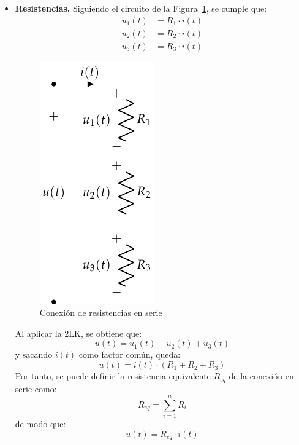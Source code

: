 \documentclass[11pt]{book} %
\numberwithin{dummy}{section}
\theoremstyle{ocrenumbox}
\theoremstyle{blacknumex}
\theoremstyle{blacknumbox}
\theoremstyle{ocrenum}
\begin{document}
	\begin{itemize}
		\item \textbf{Resistencias.} Siguiendo el circuito de la Figura~\ref{fig.serie}, se cumple que:
		\begin{align*}
			u_1(t) &= R_1 \cdot i(t)\\
			u_2(t) &= R_2 \cdot i(t)\\
			u_3(t) &= R_3 \cdot i(t)
		\end{align*}
		\begin{figure}[htbp]
			\centering
			\includegraphics[width=0.2\linewidth]{../figs/AsociacionSerie.pdf}
			\caption{Conexión de resistencias en serie}
			\label{fig.serie}
		\end{figure}
		Al aplicar la 2LK, se obtiene que: 
		\begin{equation*}
			u(t) = u_1(t) + u_2(t) + u_3(t)
		\end{equation*}
		y sacando $i(t)$ como factor común, queda:
		\begin{equation*}
			u(t) = i(t) \cdot (R_1 + R_2 + R_3)
		\end{equation*}
		Por tanto, se puede definir la resistencia equivalente $R_{eq}$ de la conexión en serie como:
		\begin{equation}
			\boxed{R_{eq} = \sum_{i = 1}^n R_i}
		\end{equation}
		de modo que:
		\begin{equation*}
			u(t) = R_{eq} \cdot i(t)
		\end{equation*}
		

\end{itemize}
\end{document}
